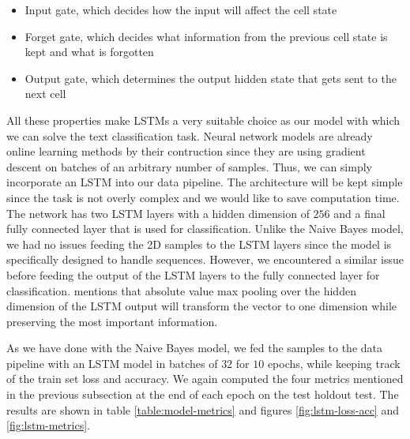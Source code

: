 \documentclass[12pt]{extreport}
\begin{document}
\begin{itemize}
    \item Input gate, which decides how the input will affect the cell state
    \item Forget gate, which decides what information from the previous cell state is kept and what is forgotten
    \item Output gate, which determines the output hidden state that gets sent to the next cell
\end{itemize}

All these properties make LSTMs a very suitable choice as our model with which we can solve the text classification task. Neural network models are already online learning methods by their contruction since they are using gradient descent on batches of an arbitrary number of samples. Thus, we can simply incorporate an LSTM into our data pipeline. The architecture will be kept simple since the task is not overly complex and we would like to save computation time. The network has two LSTM layers with a hidden dimension of $256$ and a final fully connected layer that is used for classification. Unlike the Naive Bayes model, we had no issues feeding the 2D samples to the LSTM layers since the model is specifically designed to handle sequences. However, we encountered a similar issue before feeding the output of the LSTM layers to the fully connected layer for classification. \cite{maxpoolinglstm} mentions that absolute value max pooling over the hidden dimension of the LSTM output will transform the vector to one dimension while preserving the most important information.

As we have done with the Naive Bayes model, we fed the samples to the data pipeline with an LSTM model in batches of $32$ for $10$ epochs, while keeping track of the train set loss and accuracy. We again computed the four metrics mentioned in the previous subsection at the end of each epoch on the test holdout test. The results are shown in table \ref{table:model-metrics} and figures \ref{fig:lstm-loss-acc} and \ref{fig:lstm-metrics}.
\end{document}
